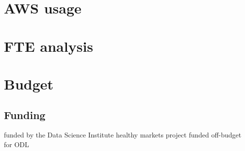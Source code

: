 \section{AWS usage}
\section{FTE analysis}
\section{Budget}
\subsection{Funding}
funded by the Data Science Institute
healthy markets project funded off-budget for ODL